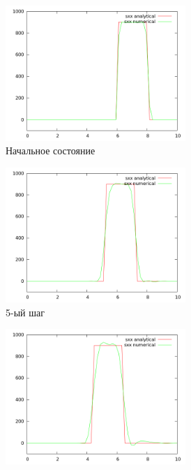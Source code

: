 \begin{figure}[H]
\begin{subfigure}[b]{0.5\textwidth}
\centering
\includegraphics[width=0.75\textwidth]{png/veryfication/0.4/p-wave-along-x0.png}
\caption{Начальное состояние}
\end{subfigure}
\begin{subfigure}[b]{0.5\textwidth}
\centering
\includegraphics[width=0.75\textwidth]{png/veryfication/0.4/p-wave-along-x5.png}
\caption{5-ый шаг}
\end{subfigure}
\begin{subfigure}[b]{0.5\textwidth}
\centering
\includegraphics[width=0.75\textwidth]{png/veryfication/0.4/p-wave-along-x10.png}

\end{subfigure}
\end{figure}
